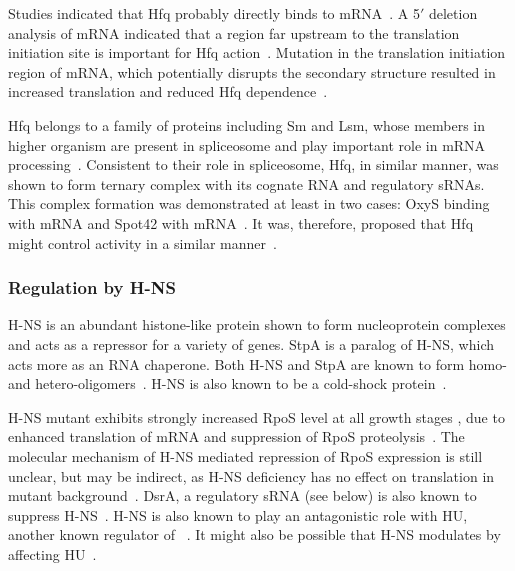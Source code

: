 Studies indicated that Hfq probably directly binds to 
mRNA~\citep{Majdalani2001,Muffler1996b,Sledjeski2001,Zhang1998}. A
5$'$ deletion analysis of  mRNA indicated that a region
far upstream to the translation initiation site is important for
Hfq action~\citep{Cunning1998}. Mutation in the translation
initiation region of  mRNA, which potentially disrupts the
secondary structure resulted in increased  translation and
reduced Hfq dependence~\citep{Brown1997}.

Hfq belongs to a family of proteins including Sm and Lsm, whose
members in higher organism are present in spliceosome and play
important role in mRNA processing~\citep{Moller2002,Zhang2002}.
Consistent to their role in spliceosome, Hfq, in similar manner,
was shown to form ternary complex with its cognate RNA and
regulatory sRNAs. This complex formation was demonstrated at least
in two cases: OxyS binding with  mRNA and Spot42 with
 mRNA~\citep{Moller2002,Zhang2002}. It was, therefore,
proposed that Hfq might control  activity in a similar
manner~\citep{Wassarman2002,Hengge2002}.

\subsubsection{Regulation by H-NS}

H-NS is an abundant histone-like protein shown to form
nucleoprotein complexes and acts as a repressor for a variety of
genes. StpA is a paralog of H-NS, which acts more as an RNA
chaperone. Both H-NS and StpA are known to form homo- and
hetero-oligomers~\citep[reviewed
in][]{Atlung1997,Dorman1999,Williams1997}. H-NS is also known to
be a cold-shock protein~\citep{Teana1991}.

H-NS mutant exhibits strongly increased RpoS level at all growth
stages \citep{Barth1995,Yamashino1995}, due to enhanced
translation of  mRNA and suppression of RpoS
proteolysis~\citep{Yamashino1995}. The molecular mechanism of H-NS
mediated repression of RpoS expression is still unclear, but may
be indirect, as H-NS deficiency has no effect on 
translation in  mutant background~\citep{Muffler1996}.
DsrA, a regulatory sRNA (see below) is also known to suppress
H-NS~\citep{Lease2000}. H-NS is also known to play an antagonistic
role with HU, another known regulator of
~\citep{Dri1992,Deighan2000,Painbeni1997}. It might also
be possible that H-NS modulates  by affecting
HU~\citep{Hengge2002}.

